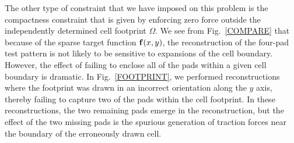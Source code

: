 \documentclass[aps,prl,reprint,groupedaddress,twocolumn]{revtex4-1}
\def\f{{\bf f}}
\begin{document}



The other type of constraint that we have imposed on this problem is
the compactness constraint that is given by enforcing zero force
outside the independently determined cell footprint $\Omega$. We see
from Fig.~\ref{COMPARE} that because of the sparse target function
$\f(x,y)$, the reconstruction of the four-pad test pattern is not
likely to be sensitive to expansions of the cell boundary.  However,
the effect of failing to enclose all of the pads within a given cell
boundary is dramatic. In Fig.~\ref{FOOTPRINT}, we performed
reconstructions where the footprint was drawn in an incorrect
orientation along the $\hat{y}$ axis, thereby failing to capture two
of the pads within the cell footprint. In these reconstructions, the
two remaining pads emerge in the reconstruction, but the effect of the
two missing pads is the spurious generation of traction forces near
the boundary of the erroneously drawn cell.
\end{document}
